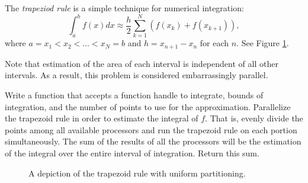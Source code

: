 \begin{problem}
The \emph{trapeziod rule} is a simple technique for numerical integration:
\[
\int_{a}^b f(x) dx \approx \frac{h}{2} \sum_{k=1}^N (f(x_{k}) + f(x_{k+1})),
\]
where $a = x_1 < x_2 < \ldots < x_N = b$ and $h = x_{n+1} - x_{n}$ for each $n$.
See Figure \ref{fig:parallel-intro-traprule}.


Note that estimation of the area of each interval is independent of all other intervals.
As a result, this problem is considered embarrassingly parallel.

Write a function that accepts a function handle to integrate, bounds of integration, and the number of points to use for the approximation.
Parallelize the trapezoid rule in order to estimate the integral of $f$.
That is, evenly divide the points among all available processors and run the trapezoid rule on each portion simultaneously.
The sum of the results of all the processors will be the estimation of the integral over the entire interval of integration.
Return this sum.

\begin{figure}[H]

\begin{center}

\end{center}
\caption{A depiction of the trapezoid rule with uniform partitioning.}
\label{fig:parallel-intro-traprule}
\end{figure}
\end{problem}


